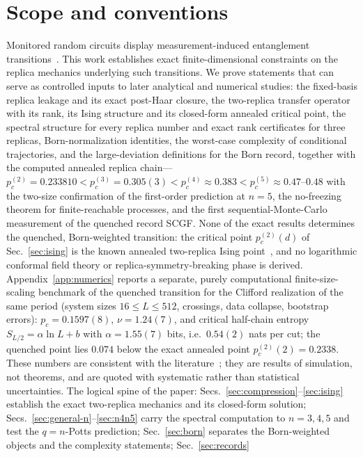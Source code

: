 \documentclass[aps,prx,reprint,superscriptaddress,nobibnotes,longbibliography]{revtex4-2}
\theoremstyle{remark}
\begin{document}

\maketitle

\section{Scope and conventions}

Monitored random circuits display measurement-induced entanglement transitions~\cite{Li2018,Skinner2019,Chan2019,Gullans2020,Choi2020,Vasseur2019,Jian2020,Bao2020}.  This work establishes exact finite-dimensional constraints on the replica mechanics underlying such transitions.  We prove statements that can serve as controlled inputs to later analytical and numerical studies: the fixed-basis replica leakage and its exact post-Haar closure, the two-replica transfer operator with its rank, its Ising structure and its closed-form annealed critical point, the spectral structure for every replica number and exact rank certificates for three replicas, Born-normalization identities, the worst-case complexity of conditional trajectories, and the large-deviation definitions for the Born record, together with the computed annealed replica chain---$p_c^{(2)}=0.233810<p_c^{(3)}=0.305(3)<p_c^{(4)}\approx0.383<p_c^{(5)}\approx0.47$--$0.48$ with the two-size confirmation of the first-order prediction at $n=5$, the no-freezing theorem for finite-reachable processes, and the first sequential-Monte-Carlo measurement of the quenched record SCGF.  None of the exact results determines the quenched, Born-weighted transition: the critical point $p_c^{(2)}(d)$ of Sec.~\ref{sec:ising} is the known annealed two-replica Ising point~\cite{Bao2020,Houtappel1950}, and no logarithmic conformal field theory or replica-symmetry-breaking phase is derived.  Appendix~\ref{app:numerics} reports a separate, purely computational finite-size-scaling benchmark of the quenched transition for the Clifford realization of the same period (system sizes $16\le L\le512$, crossings, data collapse, bootstrap errors): $p_c=0.1597(8)$, $\nu=1.24(7)$, and critical half-chain entropy $S_{L/2}=\alpha\ln L+b$ with $\alpha=1.55(7)$ bits, i.e.\ $0.54(2)$ nats per cut; the quenched point lies $0.074$ below the exact annealed point $p_c^{(2)}(2)=0.2338$.  These numbers are consistent with the literature~\cite{Li2019,Zabalo2020,Sierant2022}; they are results of simulation, not theorems, and are quoted with systematic rather than statistical uncertainties.  The logical spine of the paper: Secs.~\ref{sec:compression}--\ref{sec:ising} establish the exact two-replica mechanics and its closed-form solution; Secs.~\ref{sec:general-n}--\ref{sec:n4n5} carry the spectral computation to $n=3,4,5$ and test the $q=n$-Potts prediction; Sec.~\ref{sec:born} separates the Born-weighted objects and the complexity statements; Sec.~\ref{sec:records} 
\end{document}
